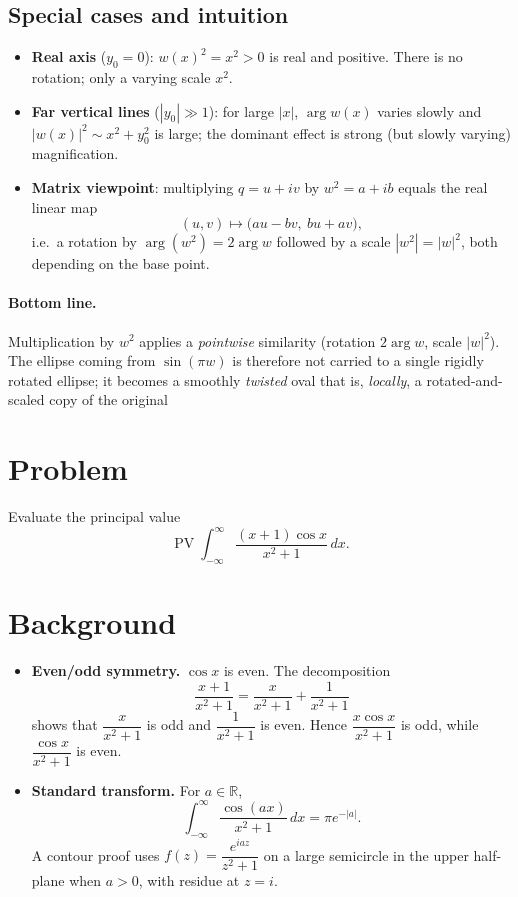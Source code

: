 \documentclass[12pt,a4paper]{article}
\begin{document}
\subsection*{Special cases and intuition}
\begin{itemize}
	\item \textbf{Real axis} (\(y_{0}=0\)): \(w(x)^{2}=x^{2}>0\) is real and positive. There is no rotation; only a varying scale \(x^{2}\).
	\item \textbf{Far vertical lines} (\(|y_{0}|\gg 1\)): for large \(|x|\), \(\arg w(x)\) varies slowly and \(|w(x)|^{2}\sim x^{2}+y_{0}^{2}\) is large; the dominant effect is strong (but slowly varying) magnification.
	\item \textbf{Matrix viewpoint}: multiplying \(q=u+iv\) by \(w^{2}=a+ib\) equals the real linear map
	\[
	(u,v)\mapsto \bigl(au-bv,\ bu+av\bigr),
	\]
	i.e.\ a rotation by \(\arg(w^{2})=2\arg w\) followed by a scale \(|w^{2}|=|w|^{2}\), both depending on the base point.
\end{itemize}

\paragraph{Bottom line.}
Multiplication by \(w^{2}\) applies a \emph{pointwise} similarity (rotation \(2\arg w\), scale \(|w|^{2}\)). The ellipse coming from \(\sin(\pi w)\) is therefore not carried to a single rigidly rotated ellipse; it becomes a smoothly \emph{twisted} oval that is, \emph{locally}, a rotated-and-scaled copy of the original

\section*{Problem}
Evaluate the principal value
\[
\operatorname{PV}\int_{-\infty}^{\infty}\frac{(x+1)\cos x}{x^{2}+1}\,dx.
\]

\section*{Background}
\begin{itemize}
	\item \textbf{Even/odd symmetry.} $\cos x$ is even. The decomposition
	\[
	\frac{x+1}{x^{2}+1}=\frac{x}{x^{2}+1}+\frac{1}{x^{2}+1}
	\]
	shows that $\dfrac{x}{x^{2}+1}$ is odd and $\dfrac{1}{x^{2}+1}$ is even. Hence
	$\dfrac{x\cos x}{x^{2}+1}$ is odd, while $\dfrac{\cos x}{x^{2}+1}$ is even.
	\item \textbf{Standard transform.} For $a\in\mathbb R$,
	\[
	\int_{-\infty}^{\infty}\frac{\cos(ax)}{x^{2}+1}\,dx=\pi e^{-|a|}.
	\]
	A contour proof uses $f(z)=\dfrac{e^{iaz}}{z^{2}+1}$ on a large semicircle
	in the upper half-plane when $a>0$, with residue at $z=i$.
\end{itemize}
\end{document}
